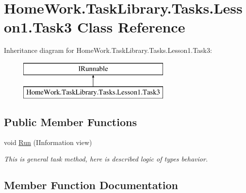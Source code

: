 \hypertarget{class_home_work_1_1_task_library_1_1_tasks_1_1_lesson1_1_1_task3}{}\section{Home\+Work.\+Task\+Library.\+Tasks.\+Lesson1.\+Task3 Class Reference}
\label{class_home_work_1_1_task_library_1_1_tasks_1_1_lesson1_1_1_task3}
Inheritance diagram for Home\+Work.\+Task\+Library.\+Tasks.\+Lesson1.\+Task3\+:\begin{figure}[H]
\begin{center}
\leavevmode
\includegraphics[height=2.000000cm]{class_home_work_1_1_task_library_1_1_tasks_1_1_lesson1_1_1_task3}
\end{center}
\end{figure}
\subsection*{Public Member Functions}
\begin{DoxyCompactItemize}
\item 
void \mbox{\hyperlink{class_home_work_1_1_task_library_1_1_tasks_1_1_lesson1_1_1_task3_abd90f2c4fa48185cbbeb54ce6a48f4f2}{Run}} (I\+Information view)
\begin{DoxyCompactList}\small\item\em This is general task method, here is described logic of types behavior. \end{DoxyCompactList}\end{DoxyCompactItemize}


\subsection{Member Function Documentation}
\mbox{\label{class_home_work_1_1_task_library_1_1_tasks_1_1_lesson1_1_1_task3_abd90f2c4fa48185cbbeb54ce6a48f4f2}} 
